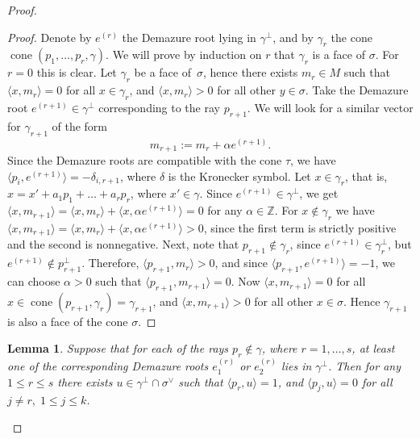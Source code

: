 \documentclass[a4paper, 11pt]{amsart}
\theoremstyle{plain}
\newtheorem{lemma}[theorem]{Lemma}
\theoremstyle{remark}
\theoremstyle{definition}
\newcommand{\ZZ}{\mathbb{Z}}
\DeclareMathOperator{\cone}{cone}
\begin{document}
\begin{proof}
	\begin{proof}
	Denote by $e^{(r)}$ the Demazure root lying in $\gamma^\perp$, and by $\gamma_r$ the cone $\cone(p_1, \ldots, p_r, \gamma)$. We will prove by induction on $r$ that $\gamma_r$ is a face of $\sigma$. For $r = 0$ this is clear. Let $\gamma_r$ be a face of~$\sigma$, hence there exists $m_r \in M$ such that $\langle x, m_r\rangle = 0$ for all $x \in \gamma_r$, and $\langle x, m_r\rangle > 0$ for all other $y \in \sigma$. Take the Demazure root $e^{(r+1)} \in \gamma^\perp$ corresponding to the ray $p_{r+1}$. We will look for a similar vector for $\gamma_{r+1}$ of the form
	$$m_{r+1}:=m_r + \alpha e^{(r+1)}. $$ 
	Since the Demazure roots are compatible with the cone $\tau$, we have $\langle p_i,  e^{(r+1)} \rangle = -\delta_{i, r+1}$, where $\delta$ is the Kronecker symbol. Let $x \in \gamma_r$, that is, $x = x' + a_1 p_1 + \ldots + a_r p_r$, where ${x' \in \gamma}$. Since $e^{(r + 1)} \in \gamma^\perp$, we get $\langle x , m_{r+1} \rangle = \langle x , m_r \rangle + \langle x , \alpha e^{(r+1)} \rangle = 0$ for any $\alpha \in \ZZ$. For $x \notin \gamma_r$ we have $\langle x , m_{r+1} \rangle = \langle x , m_r \rangle  + \langle x , \alpha e^{(r+1)} \rangle > 0$, since the first term is strictly positive and the second is nonnegative. Next, note that $p_{r+1} \notin \gamma_r$, since $e^{(r+1)} \in \gamma_r^\perp$, but $e^{(r+1)} \notin p_{r+1}^\perp$. Therefore, $\langle p_{r+1} , m_r  \rangle > 0 $, and since $\langle p_{r+1} , e^{(r+1)} \rangle = -1$, we can choose $\alpha > 0$ such that $\langle p_{r+1} ,m_{r+1}\rangle = 0$. Now $\langle x, m_{r+1} \rangle = 0$ for all $x \in \cone(p_{r+1}, \gamma_r) = \gamma_{r+1}$, and $\langle x, m_{r+1} \rangle > 0$ for all other $x \in \sigma$. Hence $\gamma_{r+1}$ is also a face of the cone $\sigma$.
	\end{proof}

\begin{lemma}\label{lm:perpcone}
Suppose that for each of the rays $p_r \notin \gamma$, where $r = 1, \ldots, s$, at least one of the corresponding Demazure roots $e_1^{(r)}$ or $e_2^{(r)}$ lies in $\gamma^\perp$. Then for any $1 \leq r \leq s$ there exists $u \in \gamma^\perp \cap \sigma^\vee$ such that $\langle p_r, u \rangle = 1$, and $\langle p_j, u \rangle = 0$ for all $j \neq r,\; 1 \leq j \leq k$.
\end{lemma}


\end{proof}
\end{document}
